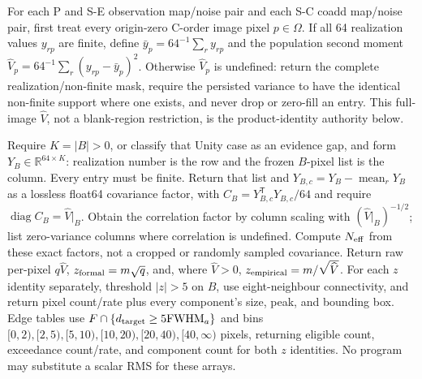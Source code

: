 \documentclass[11pt]{article}
\begin{document}
For each P and S-E observation map/noise pair and each S-C coadd map/noise pair,
first treat every origin-zero C-order image pixel \(p\in\Omega\).  If all 64
realization values \(y_{rp}\) are finite, define
\(\bar y_p=64^{-1}\sum_r y_{rp}\) and the population second moment
\(\widehat V_p=64^{-1}\sum_r(y_{rp}-\bar y_p)^2\).  Otherwise
\(\widehat V_p\) is undefined: return the complete realization/non-finite mask,
require the persisted variance to have the identical non-finite support where
one exists, and never drop or zero-fill an entry.  This full-image
\(\widehat V\), not a blank-region restriction, is the product-identity
authority below.

Require \(K=|B|>0\), or classify that Unity case as an evidence gap, and form
\(Y_B\in\mathbb R^{64\times K}\): realization number is the row and the frozen
\(B\)-pixel list is the column.  Every entry must be finite.  Return that list
and \(Y_{B,c}=Y_B-\operatorname{mean}_{r}Y_B\) as a lossless float64 covariance
factor, with \(C_B=Y_{B,c}^{\mathsf T}Y_{B,c}/64\) and require
\(\operatorname{diag}C_B=\widehat V|_B\).  Obtain the correlation factor by
column scaling with \((\widehat V|_B)^{-1/2}\); list zero-variance columns where
correlation is undefined.  Compute \(N_{\rm eff}\) from these exact factors,
not a cropped or randomly sampled covariance.  Return raw per-pixel
\(q\widehat V\), \(z_{\rm formal}=m\sqrt q\), and, where
\(\widehat V>0\), \(z_{\rm empirical}=m/\sqrt{\widehat V}\).  For each \(z\)
identity separately, threshold \(|z|>5\) on \(B\), use eight-neighbour
connectivity, and return pixel count/rate plus every component's size, peak,
and bounding box.  Edge tables use
\(F\cap\{d_{\rm target}\ge5\mathrm{FWHM}_a\}\) and bins
\([0,2),[2,5),[5,10),[10,20),[20,40),[40,\infty)\) pixels, returning
eligible count, exceedance count/rate, and component count for both \(z\)
identities.  No program may substitute a scalar RMS for these arrays.
\end{document}
